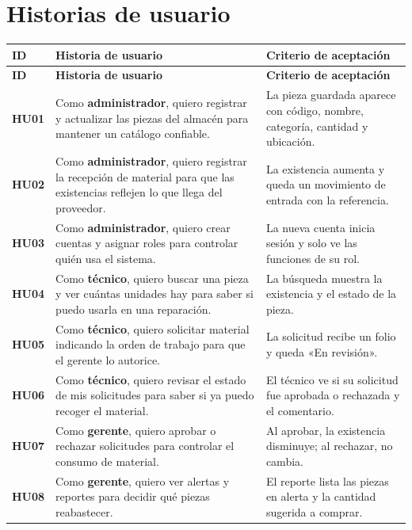 \documentclass[12pt,letterpaper]{article}
\newcommand{\encabezado}[3]{\rowcolor{azulClaro} \textbf{#1} & \textbf{#2} & \textbf{#3} \\ \hline}
\begin{document}
\section{Historias de usuario}

\begin{longtable}{|>{\bfseries}p{1.3cm}|p{8.1cm}|p{5.4cm}|}
\hline
\encabezado{ID}{Historia de usuario}{Criterio de aceptación}
\endfirsthead
\hline
\encabezado{ID}{Historia de usuario}{Criterio de aceptación}
\endhead
HU01 & Como \textbf{administrador}, quiero registrar y actualizar las piezas del almacén para mantener un catálogo confiable. & La pieza guardada aparece con código, nombre, categoría, cantidad y ubicación. \\ \hline
HU02 & Como \textbf{administrador}, quiero registrar la recepción de material para que las existencias reflejen lo que llega del proveedor. & La existencia aumenta y queda un movimiento de entrada con la referencia. \\ \hline
HU03 & Como \textbf{administrador}, quiero crear cuentas y asignar roles para controlar quién usa el sistema. & La nueva cuenta inicia sesión y solo ve las funciones de su rol. \\ \hline
HU04 & Como \textbf{técnico}, quiero buscar una pieza y ver cuántas unidades hay para saber si puedo usarla en una reparación. & La búsqueda muestra la existencia y el estado de la pieza. \\ \hline
HU05 & Como \textbf{técnico}, quiero solicitar material indicando la orden de trabajo para que el gerente lo autorice. & La solicitud recibe un folio y queda «En revisión». \\ \hline
HU06 & Como \textbf{técnico}, quiero revisar el estado de mis solicitudes para saber si ya puedo recoger el material. & El técnico ve si su solicitud fue aprobada o rechazada y el comentario. \\ \hline
HU07 & Como \textbf{gerente}, quiero aprobar o rechazar solicitudes para controlar el consumo de material. & Al aprobar, la existencia disminuye; al rechazar, no cambia. \\ \hline
HU08 & Como \textbf{gerente}, quiero ver alertas y reportes para decidir qué piezas reabastecer. & El reporte lista las piezas en alerta y la cantidad sugerida a comprar. \\ \hline
\end{longtable}

\end{document}
